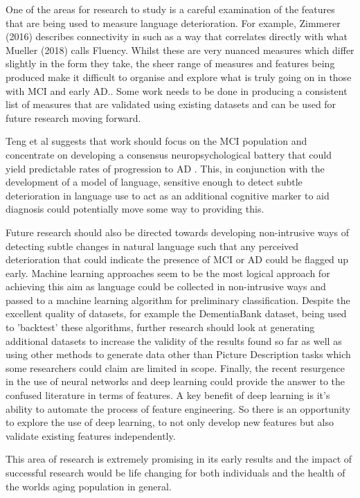 One of the areas for research to study is a careful examination of the features that are being used to measure language deterioration. For example, Zimmerer (2016) \cite{Zimmerer2016} describes connectivity in such as a way that correlates directly with what Mueller (2018) \cite{Mueller2018a} calls Fluency. Whilst these are very nuanced measures which differ slightly in the form they take, the sheer range of measures and features being produced make it difficult to organise and explore what is truly going on in those with MCI and early AD.. Some work needs to be done in producing a consistent list of measures that are validated using existing datasets and can be used for future research moving forward. \newline
\par
Teng et al suggests that work should focus on the MCI population and concentrate on developing a consensus neuropsychological battery that could yield predictable rates of progression to AD \cite{Teng2009}. This, in conjunction with the development of a model of language, sensitive enough to detect subtle deterioration in language use to act as an additional cognitive marker to aid diagnosis could potentially move some way to providing this.
\par 
Future research should also be directed towards developing non-intrusive ways of detecting subtle changes in natural language such that any perceived deterioration that could indicate the presence of MCI or AD could be flagged up early. Machine learning approaches seem to be the most logical approach for achieving this aim as language could be collected in non-intrusive ways and passed to a machine learning algorithm for preliminary classification.  Despite the excellent quality of datasets, for example the DementiaBank dataset, being used to 'backtest' these algorithms, further research should look at generating additional datasets to increase the validity of the results found so far as well as using other methods to generate data other than Picture Description tasks which some researchers could claim are limited in scope. Finally, the recent resurgence in the use of neural networks and deep learning could provide the answer to the confused literature in terms of features. A key benefit of deep learning is it's ability to automate the process of feature engineering. So there is an opportunity to explore the use of deep learning, to not only develop new features but also validate existing features independently.  
\par
This area of research is extremely promising in its early results and the impact of successful research would be life changing for both individuals and the health of the worlds aging population in general.



